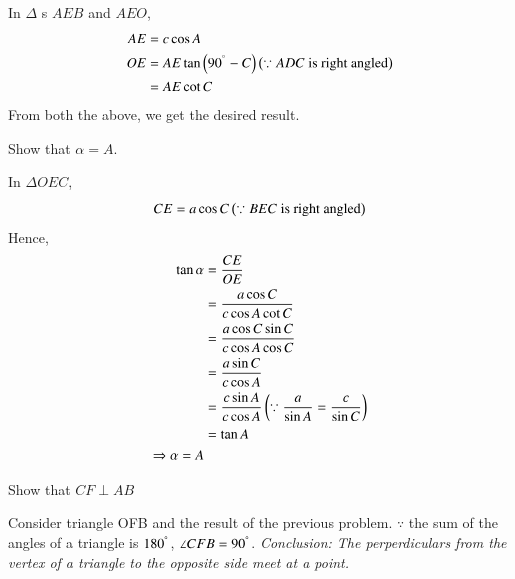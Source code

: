 \proof In $\Delta$ s $AEB$ and $AEO$,
%
\begin{align}
AE &= c \cos A \\
OE &= AE \tan \left(90^{\degree} - C\right) \left(\because ADC \text{ is right angled}\right) \\
&= AE \cot C
\end{align}
%
From both the above, we get the desired result.
%
\begin{problem}
	Show that $\alpha = A$.
\end{problem}
\proof In $\Delta OEC$,
%
\begin{equation}
CE = a \cos C \left(\because BEC \text{ is right angled}\right)
\end{equation}
%
Hence,
%
\begin{equation}
\begin{split}
\tan \alpha &= \frac{CE}{OE} \\
&=  \frac{a \cos C}{c \cos A \cot C} \\
&=  \frac{a \cos C \sin C}{c \cos A \cos C} \\
&= \frac{a \sin C}{c \cos A } \\
&= \frac{c \sin A}{c \cos A } \left(\because \frac{a}{\sin A} = \frac{c}{\sin C}\right)\\
&= \tan A\\
\Rightarrow \alpha = A
\end{split}
\end{equation}
%
\begin{problem}
	Show that $CF \perp AB$
\end{problem}
\proof Consider triangle OFB and the result of the previous problem.  $\because$ the sum of the angles of a triangle is $180^{\degree}$, $\angle CFB = 90^{\degree}$.
{\em Conclusion: The perperdiculars from the vertex of a triangle to the opposite side meet at a point.}